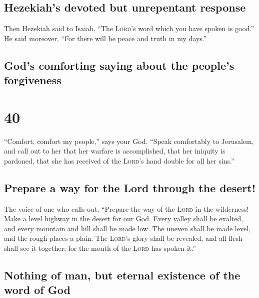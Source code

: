 \hypertarget{hezekiahs-devoted-but-unrepentant-response}{%
\subsection{Hezekiah's devoted but unrepentant
response}\label{hezekiahs-devoted-but-unrepentant-response}}

 Then Hezekiah said to Isaiah, ``The \textsc{Lord}'s word
which you have spoken is good.'' He said moreover, ``For there will be
peace and truth in my days.''

\hypertarget{gods-comforting-saying-about-the-peoples-forgiveness}{%
\subsection{God's comforting saying about the people's
forgiveness}\label{gods-comforting-saying-about-the-peoples-forgiveness}}

\hypertarget{section-39}{%
\section{40}\label{section-39}}

 ``Comfort, comfort my people,'' says your God.
 ``Speak comfortably to Jerusalem, and call out to her
that her warfare is accomplished, that her iniquity is pardoned, that
she has received of the \textsc{Lord}'s hand double for all her sins.''

\hypertarget{prepare-a-way-for-the-lord-through-the-desert}{%
\subsection{Prepare a way for the Lord through the
desert!}\label{prepare-a-way-for-the-lord-through-the-desert}}

 The voice of one who calls out, ``Prepare the way of the
\textsc{Lord} in the wilderness! Make a level highway in the desert for
our God.  Every valley shall be exalted, and every
mountain and hill shall be made low. The uneven shall be made level, and
the rough places a plain.  The \textsc{Lord}'s glory shall
be revealed, and all flesh shall see it together; for the mouth of the
\textsc{Lord} has spoken it.''

\hypertarget{nothing-of-man-but-eternal-existence-of-the-word-of-god}{%
\subsection{Nothing of man, but eternal existence of the word of
God}\label{nothing-of-man-but-eternal-existence-of-the-word-of-god}}

